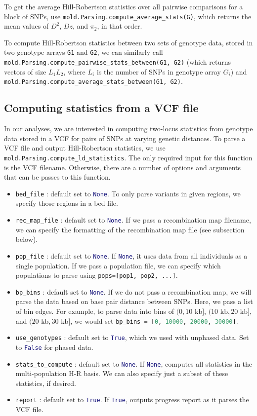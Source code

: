 \documentclass[10pt]{article}
\makeatletter
\newcommand{\py}[1]{\lstinline[breaklines=true,language=Python, showstringspaces=False]@#1@}
\makeatother
\begin{document}
To get the average Hill-Robertson statistics over all pairwise comparisons for a block of SNPs, use \py{mold.Parsing.compute_average_stats(G)}, which returns the mean values of $D^2$, $Dz$, and $\pi_2$, in that order.

To compute Hill-Robertson statistics between two sets of genotype data, stored in two genotype arrays \py{G1} and \py{G2}, we can similarly call \py{mold.Parsing.compute_pairwise_stats_between(G1, G2)} (which returns vectors of size $L_1L_2$, where $L_i$ is the number of SNPs in genotype array $G_i$) and \py{mold.Parsing.compute_average_stats_between(G1, G2)}.


\subsection{Computing statistics from a VCF file}

In our analyses, we are interested in computing two-locus statistics from genotype data stored in a VCF for pairs of SNPs at varying genetic distances.
To parse a VCF file and output Hill-Robertson statistics, we use \py{mold.Parsing.compute_ld_statistics}.
The only required input for this function is the VCF filename.
Otherwise, there are a number of options and arguments that can be passes to this function.
\begin{itemize}
\item \py{bed_file} : default set to \py{None}. To only parse variants in given regions, we specify those regions in a bed file.
\item \py{rec_map_file} : default set to \py{None}. If we pass a recombination map filename, we can specify the formatting of the recombination map file (see subsection below).
\item \py{pop_file} : default set to \py{None}. If \py{None}, it uses data from all individuals as a single population. If we pass a population file, we can specify which populations to parse using \py{pops=[pop1, pop2, ...]}.
\item \py{bp_bins} : default set to \py{None}. If we do not pass a recombination map, we will parse the data based on base pair distance between SNPs. Here, we pass a list of bin edges. For example, to parse data into bins of $(0,10\text{ kb}]$, $(10\text{ kb},20\text{ kb}]$, and $(20\text{ kb},30\text{ kb}]$, we would set \py{bp_bins = [0, 10000, 20000, 30000]}.
\item \py{use_genotypes} : default set to \py{True}, which we used with unphased data. Set to \py{False} for phased data.
\item \py{stats_to_compute} : default set to \py{None}. If \py{None}, computes all statistics in the multi-population H-R basis. We can also specify just a subset of these statistics, if desired.
\item \py{report} : default set to \py{True}. If \py{True}, outputs progress report as it parses the VCF file.
\end{itemize}
\end{document}
